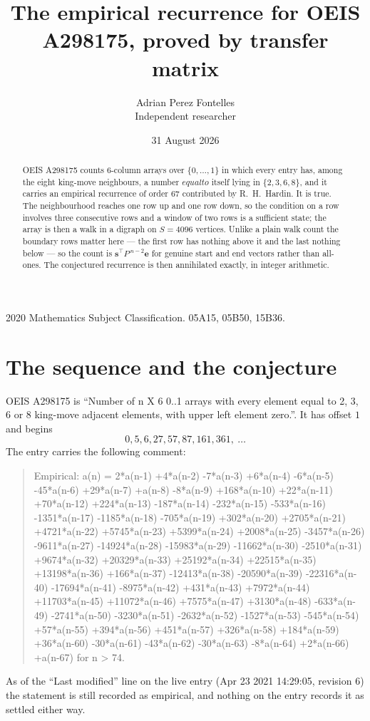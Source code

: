 \documentclass[11pt,a4paper]{article}
\title{The empirical recurrence for OEIS A298175, proved by transfer matrix}
\author{Adrian Perez Fontelles\\ \small Independent researcher}
\date{31 August 2026}
\theoremstyle{plain}
\theoremstyle{definition}
\begin{document}
\maketitle

\begin{abstract}
OEIS A298175 counts $6$-column arrays over $\{0,\dots,1\}$ in which every entry has,
among the eight king-move neighbours, a number $equal to$ itself lying in $\{2,3,6,8\}$, and it carries an empirical
recurrence of order $67$ contributed by R.~H.~Hardin. It is true. The neighbourhood
reaches one row up and one row down, so the condition on a row involves three consecutive
rows and a window of two rows is a sufficient state; the array is then a walk in a digraph
on $S=4096$ vertices. Unlike a plain walk count the boundary rows matter here --- the first
row has nothing above it and the last nothing below --- so the count is
$\mathbf{s}^{\!\top}P^{\,n-2}\mathbf{e}$ for genuine start and end vectors rather than
all-ones. The conjectured recurrence is then annihilated exactly, in integer arithmetic.
\end{abstract}

\noindent\small 2020 Mathematics Subject Classification. 05A15, 05B50, 15B36.\normalsize

\section{The sequence and the conjecture}

OEIS A298175 is ``Number of n X 6 0..1 arrays with every element equal to 2, 3, 6 or 8 king-move adjacent elements, with upper left element zero.''. It has offset
$1$ and begins
\[
0, 5, 6, 27, 57, 87, 161, 361,\ \dots
\]
The entry carries the following comment:
\begin{quote}\small
Empirical: a(n) = 2*a(n-1) +4*a(n-2) -7*a(n-3) +6*a(n-4) -6*a(n-5) -45*a(n-6) +29*a(n-7) +a(n-8) -8*a(n-9) +168*a(n-10) +22*a(n-11) +70*a(n-12) +224*a(n-13) -187*a(n-14) -232*a(n-15) -533*a(n-16) -1351*a(n-17) -1185*a(n-18) -705*a(n-19) +302*a(n-20) +2705*a(n-21) +4721*a(n-22) +5745*a(n-23) +5399*a(n-24) +2008*a(n-25) -3457*a(n-26) -9611*a(n-27) -14924*a(n-28) -15983*a(n-29) -11662*a(n-30) -2510*a(n-31) +9674*a(n-32) +20329*a(n-33) +25192*a(n-34) +22515*a(n-35) +13198*a(n-36) +166*a(n-37) -12413*a(n-38) -20590*a(n-39) -22316*a(n-40) -17694*a(n-41) -8975*a(n-42) +431*a(n-43) +7972*a(n-44) +11703*a(n-45) +11072*a(n-46) +7575*a(n-47) +3130*a(n-48) -633*a(n-49) -2741*a(n-50) -3230*a(n-51) -2632*a(n-52) -1527*a(n-53) -545*a(n-54) +57*a(n-55) +394*a(n-56) +451*a(n-57) +326*a(n-58) +184*a(n-59) +36*a(n-60) -30*a(n-61) -43*a(n-62) -30*a(n-63) -8*a(n-64) +2*a(n-66) +a(n-67) for n > 74.
\end{quote}
As of the ``Last modified'' line on the live entry (Apr 23 2021 14:29:05, revision
6) the statement is still recorded as empirical, and nothing on the entry
records it as settled either way.
\end{document}
